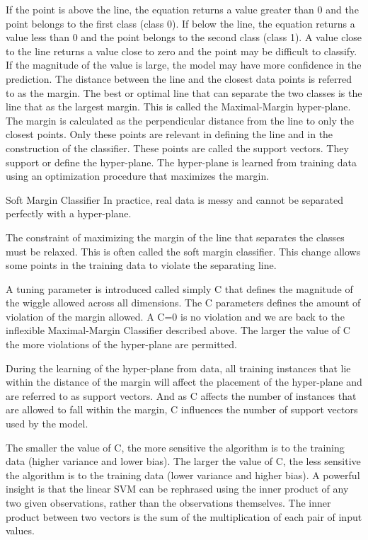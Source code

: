 \documentclass[12pt]{article}
\begin{document}
If the point is above the line, the equation returns a value greater than 0 and the point belongs to the first class (class 0). If below the line, the equation returns a value less than 0 and the point belongs to the second class (class 1). A value close to the line returns a value close to zero and the point may be difficult to classify. If the magnitude of the value is large, the model may have more confidence in the prediction. The distance between the line and the closest data points is referred to as the margin. The best or optimal line that can separate the two classes is the line that as the largest margin. This is called the Maximal-Margin hyper-plane. The margin is calculated as the perpendicular distance from the line to only the closest points. Only these points are relevant in defining the line and in the construction of the classifier. These points are called the support vectors. They support or define the hyper-plane. The hyper-plane is learned from training data using an optimization procedure that maximizes the margin.

Soft Margin Classifier
In practice, real data is messy and cannot be separated perfectly with a hyper-plane.

The constraint of maximizing the margin of the line that separates the classes must be relaxed. This is often called the soft margin classifier. This change allows some points in the training data to violate the separating line.

A tuning parameter is introduced called simply C that defines the magnitude of the wiggle allowed across all dimensions. The C parameters defines the amount of violation of the margin allowed. A C=0 is no violation and we are back to the inflexible Maximal-Margin Classifier described above. The larger the value of C the more violations of the hyper-plane are permitted.

During the learning of the hyper-plane from data, all training instances that lie within the distance of the margin will affect the placement of the hyper-plane and are referred to as support vectors. And as C affects the number of instances that are allowed to fall within the margin, C influences the number of support vectors used by the model.

The smaller the value of C, the more sensitive the algorithm is to the training data (higher variance and lower bias). The larger the value of C, the less sensitive the algorithm is to the training data (lower variance and higher bias). A powerful insight is that the linear SVM can be rephrased using the inner product of any two given observations, rather than the observations themselves. The inner product between two vectors is the sum of the multiplication of each pair of input values.
\end{document}
